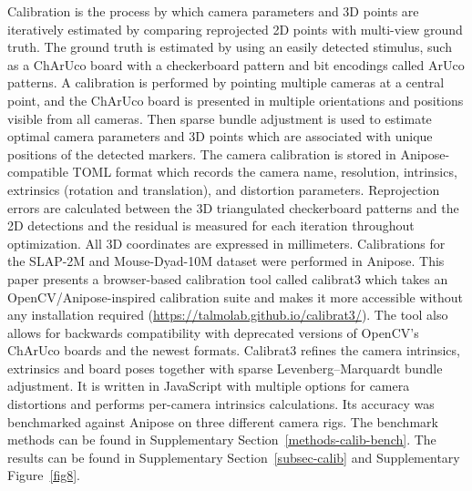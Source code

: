 \documentclass[pdflatex, sn-nature]{sn-jnl}
\theoremstyle{thmstyleone}%
\theoremstyle{thmstyletwo}%
\theoremstyle{thmstylethree}%
\begin{document}
Calibration is the process by which camera parameters and 3D points are iteratively estimated by comparing reprojected 2D points with multi-view ground truth. The ground truth is estimated by using an easily detected stimulus, such as a ChArUco board with a checkerboard pattern and bit encodings called ArUco patterns. A calibration is performed by pointing multiple cameras at a central point, and the ChArUco board is presented in multiple orientations and positions visible from all cameras. Then sparse bundle adjustment is used to estimate optimal camera parameters and 3D points which are associated with unique positions of the detected markers. The camera calibration is stored in Anipose-compatible TOML format which records the camera name, resolution, intrinsics, extrinsics (rotation and translation), and distortion parameters. Reprojection errors are calculated between the 3D triangulated checkerboard patterns and the 2D detections and the residual is measured for each iteration throughout optimization. All 3D coordinates are expressed in millimeters. Calibrations for the SLAP-2M and Mouse-Dyad-10M dataset were performed in Anipose.  
This paper presents a browser-based calibration tool called calibrat3 which takes an OpenCV/Anipose-inspired calibration suite and makes it more accessible without any installation required (\url{https://talmolab.github.io/calibrat3/}). The tool also allows for backwards compatibility with deprecated versions of OpenCV's ChArUco boards and the newest formats. Calibrat3 refines the camera intrinsics, extrinsics and board poses together with sparse Levenberg–Marquardt bundle adjustment. It is written in JavaScript with multiple options for camera distortions and performs per-camera intrinsics calculations. Its accuracy was benchmarked against Anipose on three different camera rigs. The benchmark methods can be found in Supplementary Section~\ref{methods-calib-bench}. The results can be found in Supplementary Section~\ref{subsec-calib} and Supplementary Figure~\ref{fig8}.
\end{document}
